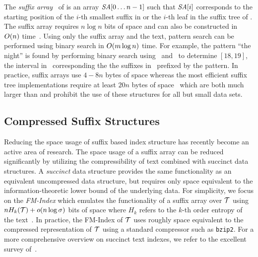 The {\it suffix array}~\cite{mm-jcomp93} of {\col} is an array $\mbox{\emph{SA}}[0\ldots n-1]$ such
that $\mbox{\emph{SA}}[i]$ corresponds to the starting position of the $i$-th smallest suffix
in {\col} or the $i$-th leaf in the suffix tree of {\col}. The suffix array requires
$n \log n$ bits of space and can also be constructed in $O(n)$ time~\cite{ksb-jacm06}.
Using only the suffix array and the text, pattern search can be performed using binary search
in $O(m \log n)$ time. For example, the pattern ``the night'' is found by performing
binary search using \SA\ and \col\ to determine \SA$[18,19]$, the interval in 
\SA\ corresponding the the suffixes in \col\ prefixed by the pattern.
In practice, suffix arrays use $4-8n$ bytes of space whereas the most efficient
suffix tree implementations require at least $20n$ bytes of space~\cite{k-spe99} which
are both much larger than {\col} and prohibit the use of these structures for all but
small data sets.

\subsection{Compressed Suffix Structures}

Reducing the space usage of suffix based index structure has recently become an 
active area of research. The space usage of a suffix array can be reduced 
significantly by utilizing the compressibility of text combined 
with succinct data structures. A {\it succinct} data structure provides the
same functionality as an equivalent uncompressed data structure, but requires
only space equivalent to the information-theoretic lower bound of the underlying
data. For simplicity, we focus on the {\it FM-Index} which emulates the
functionality of a suffix array over $\mathcal{T}$ using $n H_k(\mathcal{T})+o(n \log \sigma)$
bits of space where $H_k$ refers to the $k$-th order entropy of the text~\cite{fmmn-talg07}.
In practice, the FM-Index of $\mathcal{T}$ uses roughly space equivalent to
the compressed representation of $\mathcal{T}$ using a standard compressor such as {\tt bzip2}.
For a more comprehensive overview on succinct text indexes, we refer to the
excellent survey of~.

